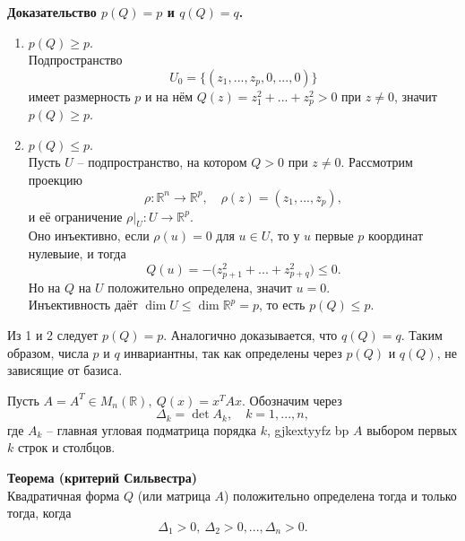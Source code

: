 \documentclass[14pt]{extreport}
\begin{document}
\begin{prbox}
        \textbf{Доказательство $p(Q)=p$ и $q(Q)=q$.}
        \begin{enumerate}
            \item $p(Q) \geq p$.\\
            Подпространство
            \[
            U_0 = \{(z_1,...,z_p,0,...,0)\}
            \]
            имеет размерность $p$ и на нём $Q(z) = z_1^2 + ... + z_p^2 > 0$ при $z \neq 0$, значит $p(Q) \geq p$.
            \item $p(Q) \leq p$.\\
            Пусть $U$ – подпространство, на котором $Q > 0$ при $z \neq 0$. Рассмотрим проекцию
            \[
            \rho: \mathbb{R}^n \rightarrow \mathbb{R}^p, \quad \rho(z) = (z_1,...,z_p),
            \]
            и её ограничение $\rho|_U: U \rightarrow \mathbb{R}^p$.\\
            Оно инъективно, если $\rho(u) = 0$ для $u \in U$, то у $u$ первые $p$ координат нулевыие, и тогда
            \[
            Q(u) = -\bigl(z_{p+1}^2 + ... + z_{p+q}^2 \bigr) \leq 0.
            \]
            Но на $Q$ на $U$ положительно определена, значит $u=0$.\\
            Инъективность даёт $\dim U \leq \dim \mathbb{R}^p=p$, то есть $p(Q) \leq p$.\\
        \end{enumerate}
        Из 1 и 2 следует $p(Q) = p$. Аналогично доказывается, что $q(Q) = q$. Таким образом, числа $p$ и $q$ инвариантны, так как определены через $p(Q)$ и $q(Q)$, не зависящие от базиса.
    \end{prbox}

    \begin{thbox}
        Пусть $A = A^T \in M_n(\mathbb{R}),\ Q(x) = x^TAx$. Обозначим через
        \[
        \Delta_k = \det A_k, \quad k = 1,...,n,
        \]
        где $A_k$ – главная угловая подматрица порядка $k$, gjkextyyfz bp $A$ выбором первых $k$ строк и столбцов.

        \textbf{Теорема (критерий Сильвестра)}\\
        Квадратичная форма $Q$ (или матрица $A$) положительно определена тогда и только тогда, когда
        \[
        \Delta_1 > 0,\ \Delta_2 > 0, ..., \Delta_n > 0.
        \]
    \end{thbox}
\end{document}
